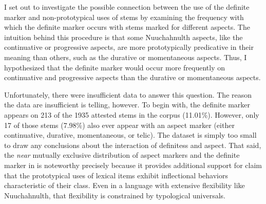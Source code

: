 I set out to investigate the possible connection between the use of the definite marker and non-prototypical uses of stems by examining the frequency with which the definite marker occurs with stems marked for different aspects.  The intuition behind this procedure is that some Nuuchahnulth aspects, like the continuative or progressive aspects, are more prototypically predicative in their meaning than others, such as the durative or momentaneous aspects. Thus, I hypothesized that the definite marker would occur more frequently on continuative and progressive aspects than the durative or momentaneous aspects.

Unfortunately, there were insufficient data to answer this question. The reason the data are insufficient is telling, however. To begin with, the definite marker appears on 213 of the 1935 attested stems in the corpus (11.01\%). However, only 17 of those stems (7.98\%) also ever appear with an aspect marker (either continuative, durative, momentaneous, or telic). The dataset is simply too small to draw any conclusions about the interaction of definitess and aspect. That said, the \emph{near} mutually exclusive distribution of aspect markers and the definite marker in  is noteworthy precisely because it provides additional support for  claim that the prototypical uses of lexical items exhibit inflectional behaviors characteristic of their class. Even in a language with extensive flexibility like Nuuchahnulth, that flexibility is constrained by typological universals.
